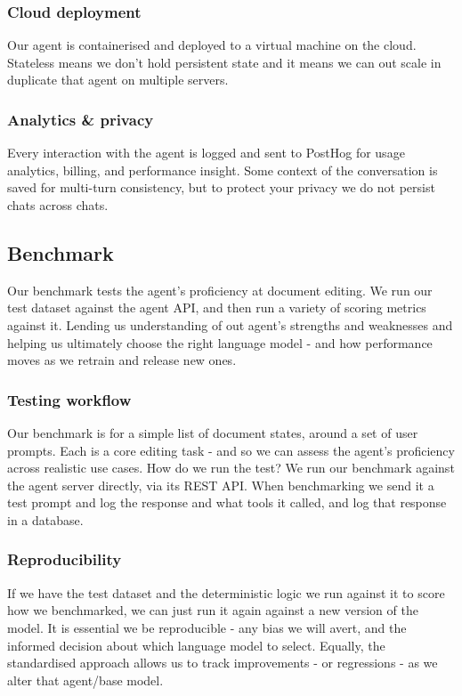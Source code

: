\subsubsection{Cloud deployment}
Our agent is containerised and deployed to a virtual machine on the cloud.
Stateless means we don't hold persistent state and it means we can out scale in duplicate that agent on multiple servers.

\subsubsection{Analytics \& privacy}
Every interaction with the agent is logged and sent to PostHog \cite{posthog} for usage analytics, billing, and performance insight.
Some context of the conversation is saved for multi-turn consistency, but to protect your privacy we do not persist chats across chats.

\subsection{Benchmark}
Our benchmark tests the agent's proficiency at document editing.
We run our test dataset against the agent API, and then run a variety of scoring metrics against it.
Lending us understanding of out agent's strengths and weaknesses and helping us ultimately choose the right language model - and how performance moves as we retrain and release new ones.

\subsubsection{Testing workflow}
Our benchmark is for a simple list of document states, around a set of user prompts.
Each is a core editing task - and so we can assess the agent's proficiency across realistic use cases.
How do we run the test?
We run our benchmark against the agent server directly, via its REST API.
When benchmarking we send it a test prompt and log the response and what tools it called, and log that response in a database.

\subsubsection{Reproducibility}
If we have the test dataset and the deterministic logic we run against it to score how we benchmarked, we can just run it again against a new version of the model.
It is essential we be reproducible - any bias we will avert, and the informed decision about which language model to select.
Equally, the standardised approach allows us to track improvements - or regressions - as we alter that agent/base model.

